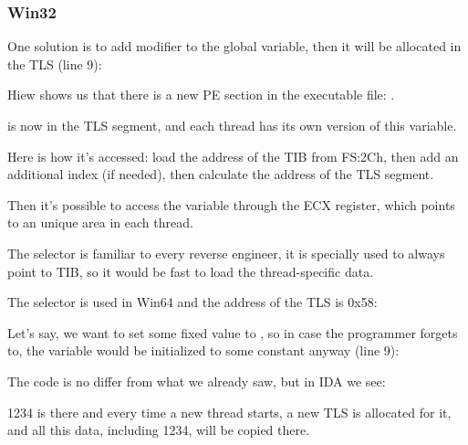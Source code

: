 \subsubsection{Win32}


One solution is to add  modifier to the global variable, 
then it will be allocated in the \ac{TLS} (line 9):



Hiew shows us that there is a new PE section in the executable file: .



 is now in the \ac{TLS} segment, and each thread has its own version of this variable.

Here is how it's accessed: load the address of the \ac{TIB} from FS:2Ch, then add an additional index (if needed),
then calculate the address of the \ac{TLS} segment.

Then it's possible to access the  variable through the ECX register, which points to an unique area in each thread.


The  selector is familiar to every reverse engineer, it is specially used to always point to \ac{TIB},
so it would be fast to load the thread-specific data.


The  selector is used in Win64 and the address of the \ac{TLS} is 0x58:




Let's say, we want to set some fixed value to , so in case the programmer forgets to,
the  variable would be initialized to some constant anyway (line 9):



The code is no differ from what we already saw, but in IDA we see:



1234 is there and every time a new thread starts, a new \ac{TLS} is allocated for it, 
and all this data, including 1234, will be copied there.

